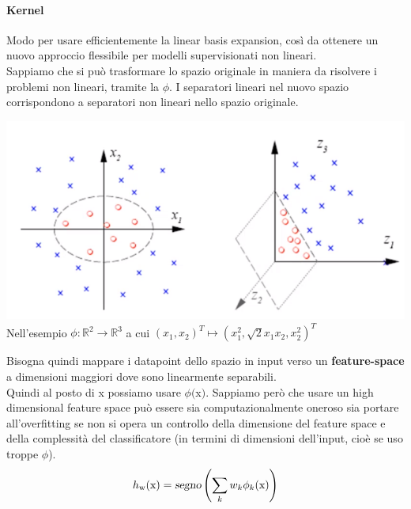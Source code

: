 \documentclass[10pt]{book}
\begin{document}
\paragraph{Kernel} Modo per usare efficientemente la linear basis expansion, così da ottenere un nuovo approccio flessibile per modelli supervisionati non lineari.\\
Sappiamo che si può trasformare lo spazio originale in maniera da risolvere i problemi non lineari, tramite la $\phi$. I separatori lineari nel nuovo spazio corrispondono a separatori non lineari nello spazio originale.
\begin{center}
	\includegraphics[scale=0.6]{mlkernel.png}\\
	Nell'esempio $\phi : \mathbb{R}^2 \rightarrow \mathbb{R}^3$ a cui $(x_1, x_2)^T\mapsto (x_1^2, \sqrt{2}x_1x_2, x_2^2)^T$
\end{center}
Bisogna quindi mappare i datapoint dello spazio in input verso un \textbf{feature-space} a dimensioni maggiori dove sono linearmente separabili.\\
Quindi al posto di x possiamo usare $\phi($x$)$. Sappiamo però che usare un high dimensional feature space può essere sia computazionalmente oneroso sia portare all'overfitting se non si opera un controllo della dimensione del feature space e della complessità del classificatore (in termini di dimensioni dell'input, cioè se uso troppe $\phi$).
$$h_\text{w}(\text{x}) = \textsl{segno}\left(\sum_k w_k\phi_k(\text{x})\right)$$
\end{document}

